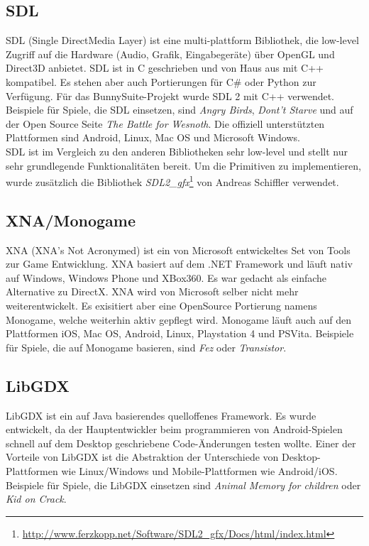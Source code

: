 \subsection{SDL}
SDL (Single DirectMedia Layer) ist eine multi-plattform Bibliothek, die low-level Zugriff auf die Hardware (Audio, Grafik, Eingabegeräte) über OpenGL und Direct3D anbietet. SDL ist in C geschrieben und von Haus aus mit C++ kompatibel. Es stehen aber auch Portierungen für C\# oder Python zur Verfügung. Für das BunnySuite-Projekt wurde SDL 2 mit C++ verwendet. Beispiele für Spiele, die SDL einsetzen, sind \emph{Angry Birds}, \emph{Dont't Starve} und auf der Open Source Seite \emph{The Battle for Wesnoth}. Die offiziell unterstützten Plattformen sind Android, Linux, Mac OS und Microsoft Windows.\\
SDL ist im Vergleich zu den anderen Bibliotheken sehr low-level und stellt nur sehr grundlegende Funktionalitäten bereit. Um die Primitiven zu implementieren, wurde zusätzlich die Bibliothek \textit{SDL2\_gfx}\footnote{\url{http://www.ferzkopp.net/Software/SDL2\_gfx/Docs/html/index.html}} von Andreas Schiffler verwendet.

\subsection{XNA/Monogame}
XNA (XNA's Not Acronymed) ist ein von Microsoft entwickeltes Set von Tools zur Game Entwicklung. XNA basiert auf dem .NET Framework und läuft nativ auf Windows, Windows Phone und XBox360. Es war gedacht als einfache Alternative zu DirectX. XNA wird von Microsoft selber nicht mehr weiterentwickelt. Es exisitiert aber eine OpenSource Portierung namens Monogame, welche weiterhin aktiv gepflegt wird. Monogame läuft auch auf den Plattformen iOS, Mac OS, Android, Linux, Playstation 4 und PSVita. Beispiele für Spiele, die auf Monogame basieren, sind \emph{Fez} oder \emph{Transistor}.

\subsection{LibGDX}
LibGDX ist ein auf Java basierendes quelloffenes Framework. Es wurde entwickelt, da der Hauptentwickler beim programmieren von Android-Spielen schnell auf dem Desktop geschriebene Code-Änderungen testen wollte. Einer der Vorteile von LibGDX ist die Abstraktion der Unterschiede von Desktop-Plattformen wie Linux/Windows und Mobile-Plattformen wie Android/iOS. Beispiele für Spiele, die LibGDX einsetzen sind \emph{Animal Memory for children} oder \emph{Kid on Crack}.

